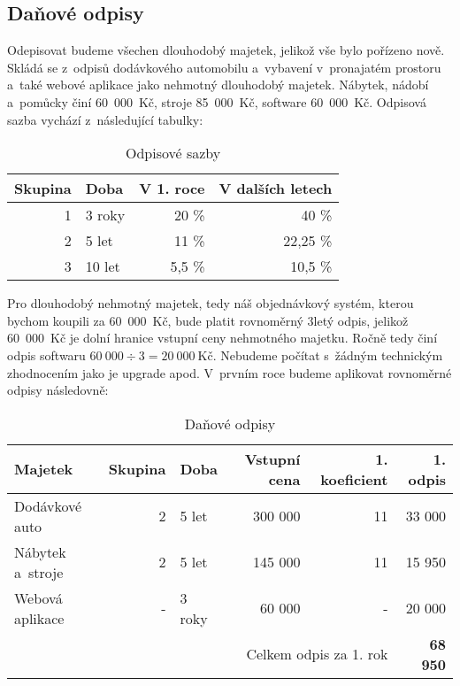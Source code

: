 \subsection{Daňové odpisy}
Odepisovat budeme všechen dlouhodobý majetek, jelikož vše bylo pořízeno nově. Skládá se z~odpisů dodávkového automobilu a~vybavení v~pronajatém prostoru a~také webové aplikace jako nehmotný dlouhodobý majetek. Nábytek, nádobí a~pomůcky činí 60~000~Kč, stroje 85~000~Kč, software 60~000~Kč. Odpisová sazba vychází z~následující tabulky:

\begin{table}[htbp]
\begin{center}
\begin{tabular}{ r l r r }
\textbf{Skupina} & \textbf{Doba} & \textbf{V 1. roce} & \textbf{V dalších letech} \\ \hline
1                & 3 roky        & 20 \%              & 40 \%                     \\ 
2                & 5 let         & 11 \%              & 22,25 \%                  \\
3                & 10 let        & 5,5 \%             & 10,5 \%                    
\end{tabular}
\caption{Odpisové sazby \cite{andrejs}}
\label{odpisove_sazby}
\end{center}
\end{table}

Pro dlouhodobý nehmotný majetek, tedy náš objednávkový systém, kterou bychom koupili za 60~000~Kč, bude platit rovnoměrný 3letý odpis, jelikož 60~000~Kč je dolní hranice vstupní ceny nehmotného majetku. Ročně tedy činí odpis softwaru $60~000 \div 3 = 20~000~\text{Kč}$. Nebudeme počítat s~žádným technickým zhodnocením jako je upgrade apod. V~prvním roce budeme aplikovat rovnoměrné odpisy následovně:

\begin{table}[htbp]
\begin{center}
\begin{tabular}{lrlrrr}
\textbf{Majetek} & \textbf{Skupina}     & \textbf{Doba} & \textbf{Vstupní cena} & \textbf{1. koeficient}               & \textbf{1. odpis\index{odpis}} \\ \hline
Dodávkové auto   & 2                    & 5 let         & 300 000               & 11                                   & 33 000            \\
Nábytek a~stroje & 2                    & 5 let         & 145 000               & 11                                   & 15 950            \\
Webová aplikace  & -                    & 3 roky        & 60 000                & -                                    & 20 000            \\ \hline
                 & \multicolumn{1}{l}{} &               & \multicolumn{2}{r}{Celkem odpis\index{odpis} za 1. rok} & \textbf{68 950}           
\end{tabular}
\caption{Daňové odpisy}
\label{danove_odpisy}
\end{center}
\end{table}




